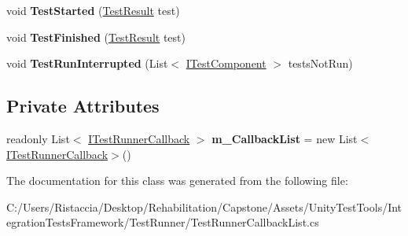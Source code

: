 \begin{DoxyCompactItemize}
void {\bfseries Test\+Started} (\hyperlink{class_unity_test_1_1_test_result}{Test\+Result} test)
\item 
\mbox{\label{class_unity_test_1_1_integration_test_runner_1_1_test_runner_callback_list_a52d3cd449825f439c5b1238420b4b412}} 
void {\bfseries Test\+Finished} (\hyperlink{class_unity_test_1_1_test_result}{Test\+Result} test)
\item 
\mbox{\label{class_unity_test_1_1_integration_test_runner_1_1_test_runner_callback_list_a13783d884187daf7c4f74a1973257ffa}} 
void {\bfseries Test\+Run\+Interrupted} (List$<$ \hyperlink{interface_unity_test_1_1_i_test_component}{I\+Test\+Component} $>$ tests\+Not\+Run)
\end{DoxyCompactItemize}
\subsection*{Private Attributes}
\begin{DoxyCompactItemize}
\item 
\mbox{\label{class_unity_test_1_1_integration_test_runner_1_1_test_runner_callback_list_aed2479f5c857e774121c9be721e693b2}} 
readonly List$<$ \hyperlink{interface_unity_test_1_1_integration_test_runner_1_1_i_test_runner_callback}{I\+Test\+Runner\+Callback} $>$ {\bfseries m\+\_\+\+Callback\+List} = new List$<$\hyperlink{interface_unity_test_1_1_integration_test_runner_1_1_i_test_runner_callback}{I\+Test\+Runner\+Callback}$>$()
\end{DoxyCompactItemize}


The documentation for this class was generated from the following file\+:\begin{DoxyCompactItemize}
\item 
C\+:/\+Users/\+Ristaccia/\+Desktop/\+Rehabilitation/\+Capstone/\+Assets/\+Unity\+Test\+Tools/\+Integration\+Tests\+Framework/\+Test\+Runner/Test\+Runner\+Callback\+List.\+cs\end{DoxyCompactItemize}
